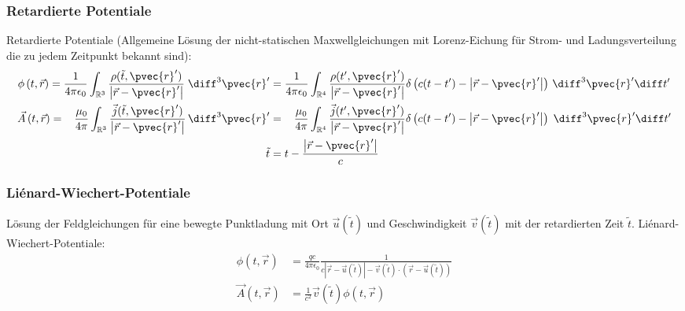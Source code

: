 \documentclass[11pt]{article}
\numberwithin{equation}{section}
\begin{document}
      \subsubsection{Retardierte Potentiale}
        Retardierte Potentiale (Allgemeine Lösung der nicht-statischen Maxwellgleichungen mit Lorenz-Eichung für Strom- und Ladungsverteilung die zu jedem Zeitpunkt bekannt sind):
        \begin{equation}
          \begin{aligned}
            \phi\left(t,\vec{r}\right)
            = \frac{1}{4\pi\epsilon_0} \int_{\mathbb{R}^3} \frac{\rho(\tilde{t},\pvec{r}')}{\left|\vec{r}-\pvec{r}'\right|}\;\diff^3 \pvec{r}'
            &=  \frac{1}{4\pi\epsilon_0} \int_{\mathbb{R}^4} \frac{\rho(t',\pvec{r}')}{\left|\vec{r}-\pvec{r}'\right|}\delta\left( c(t-t')-\left|\vec{r}-\pvec{r}'\right|\right)\,\diff^3 \pvec{r}'\diff t' \\
            \vec{A}\left(t,\vec{r}\right)
            = \phantom{\epsilon_0} \frac{\mu_0}{4\pi} \int_{\mathbb{R}^3} \frac{\vec{j}(\tilde{t},\pvec{r}')}{\left|\vec{r}-\pvec{r}'\right|}\,\diff^3 \pvec{r}'
            &=  \phantom{\epsilon_0} \frac{\mu_0}{4\pi} \int_{\mathbb{R}^4} \frac{\vec{j}(t',\pvec{r}')}{\left|\vec{r}-\pvec{r}'\right|}\delta\left( c(t-t')-\left|\vec{r}-\pvec{r}'\right|\right)\;\diff^3 \pvec{r}'\diff t' \\
            \tilde{t}&=t-\frac{\left|\vec{r}-\pvec{r}'\right|}{c}
          \end{aligned}
        \end{equation}

      \subsubsection{Liénard-Wiechert-Potentiale}

        Lösung der Feldgleichungen für eine bewegte Punktladung mit Ort $\vec{u}(\tilde{t})$ und Geschwindigkeit $\vec{v}(\tilde{t})$ mit der retardierten Zeit $\tilde{t}$. Liénard-Wiechert-Potentiale:
        \begin{equation}
          \begin{aligned}
            \phi(t,\vec{r}) & =\frac{q c}{4\pi \epsilon_0}\frac{1}{c \left|\vec{r}-\vec{u}(\tilde{t})\right|-\vec{v}(\tilde{t})\cdot\left(\vec{r}-\vec{u}(\tilde{t})\right)} \\
            \vec{A}(t,\vec{r}) &= \frac{1}{c^2}\vec{v}(\tilde{t})\phi(t,\vec{r}) \\
          \end{aligned}
        \end{equation}
\end{document}
